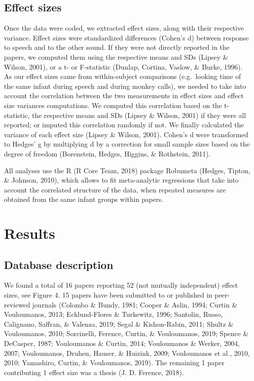 \documentclass[man]{apa6}
\begin{document}
\subsection{Effect sizes}\label{effect-sizes}

Once the data were coded, we extracted effect sizes, along with their
respective variance. Effect sizes were standardized differences (Cohen's
d) between response to speech and to the other sound. If they were not
directly reported in the papers, we computed them using the respective
means and SDs (Lipsey \& Wilson, 2001), or a t- or F-statistic (Dunlap,
Cortina, Vaslow, \& Burke, 1996). As our effect sizes came from
within-subject comparisons (e.g.~looking time of the same infant during
speech and during monkey calls), we needed to take into account the
correlation between the two measurements in effect sizes and effect size
variances computations. We computed this correlation based on the
t-statistic, the respective means and SDs (Lipsey \& Wilson, 2001) if
they were all reported; or imputed this correlation randomly if not. We
finally calculated the variance of each effect size (Lipsey \& Wilson,
2001). Cohen's d were transformed to Hedges' g by multiplying d by a
correction for small sample sizes based on the degree of freedom
(Borenstein, Hedges, Higgins, \& Rothstein, 2011).

All analyses use the R (R Core Team, 2018) package Robumeta (Hedges,
Tipton, \& Johnson, 2010), which allows to fit meta-analytic regressions
that take into account the correlated structure of the data, when
repeated measures are obtained from the same infant groups within
papers.

\section{Results}\label{results}

\subsection{Database description}\label{database-description}

We found a total of 16 papers reporting 52 (not mutually independent)
effect sizes, see Figure 4. 15 papers have been submitted to or
published in peer-reviewed journals (Colombo \& Bundy, 1981; Cooper \&
Aslin, 1994; Curtin \& Vouloumanos, 2013; Ecklund-Flores \& Turkewitz,
1996; Santolin, Russo, Calignano, Saffran, \& Valenza, 2019; Segal \&
Kishon-Rabin, 2011; Shultz \& Vouloumanos, 2010; Sorcinelli, Ference,
Curtin, \& Vouloumanos, 2019; Spence \& DeCasper, 1987; Vouloumanos \&
Curtin, 2014; Vouloumanos \& Werker, 2004, 2007; Vouloumanos, Druhen,
Hauser, \& Huizink, 2009; Vouloumanos et al., 2010, 2010; Yamashiro,
Curtin, \& Vouloumanos, 2019). The remaining 1 paper contributing 1
effect size was a thesis (J. D. Ference, 2018).
\end{document}
